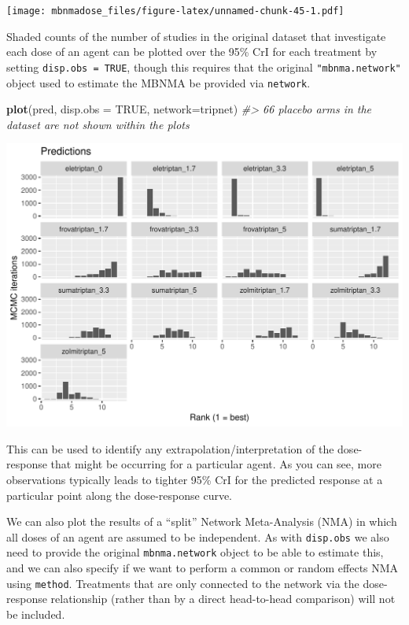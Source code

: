 \documentclass[]{article}
\newenvironment{Shaded}{\begin{snugshade}}{\end{snugshade}}
\newcommand{\CommentTok}[1]{\textcolor[rgb]{0.56,0.35,0.01}{\textit{#1}}}
\newcommand{\DataTypeTok}[1]{\textcolor[rgb]{0.13,0.29,0.53}{#1}}
\newcommand{\KeywordTok}[1]{\textcolor[rgb]{0.13,0.29,0.53}{\textbf{#1}}}
\newcommand{\NormalTok}[1]{#1}
\newcommand{\OtherTok}[1]{\textcolor[rgb]{0.56,0.35,0.01}{#1}}
\begin{document}
\texttt{[image: mbnmadose\_files/figure-latex/unnamed-chunk-45-1.pdf]}

Shaded counts of the number of studies in the original dataset that
investigate each dose of an agent can be plotted over the 95\% CrI for
each treatment by setting \texttt{disp.obs\ =\ TRUE}, though this
requires that the original \texttt{"mbnma.network"} object used to
estimate the MBNMA be provided via \texttt{network}.

\begin{Shaded}
\begin{Highlighting}[]
\KeywordTok{plot}\NormalTok{(pred, }\DataTypeTok{disp.obs =} \OtherTok{TRUE}\NormalTok{, }\DataTypeTok{network=}\NormalTok{tripnet)}
\CommentTok{#> 66 placebo arms in the dataset are not shown within the plots}
\end{Highlighting}
\end{Shaded}

\includegraphics{mbnmadose_files/figure-latex/unnamed-chunk-46-1.pdf}

This can be used to identify any extrapolation/interpretation of the
dose-response that might be occurring for a particular agent. As you can
see, more observations typically leads to tighter 95\% CrI for the
predicted response at a particular point along the dose-response curve.

We can also plot the results of a ``split'' Network Meta-Analysis (NMA)
in which all doses of an agent are assumed to be independent. As with
\texttt{disp.obs} we also need to provide the original
\texttt{mbnma.network} object to be able to estimate this, and we can
also specify if we want to perform a common or random effects NMA using
\texttt{method}. Treatments that are only connected to the network via
the dose-response relationship (rather than by a direct head-to-head
comparison) will not be included.
\end{document}
